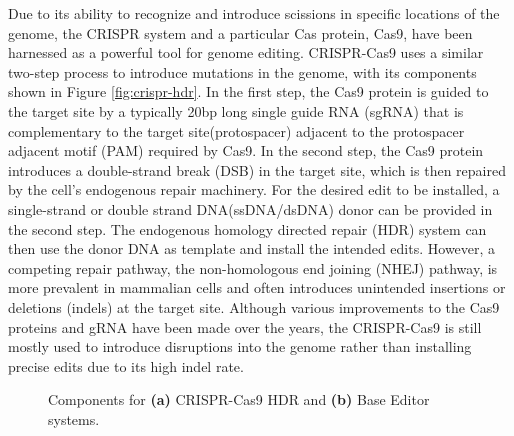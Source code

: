 Due to its ability to recognize and introduce scissions in specific locations of the genome, the CRISPR system and a particular Cas protein, Cas9, have been harnessed as a powerful tool for genome editing. CRISPR-Cas9 uses a similar two-step process to introduce mutations in the genome, with its components shown in Figure \ref{fig:crispr-hdr}. In the first step, the Cas9 protein is guided to the target site by a typically 20bp long single guide RNA (sgRNA) that is complementary to the target site(protospacer) adjacent to the protospacer adjacent motif (PAM) required by Cas9. In the second step, the Cas9 protein introduces a double-strand break (DSB) in the target site, which is then repaired by the cell's endogenous repair machinery. For the desired edit to be installed, a single-strand or double strand DNA(ssDNA/dsDNA) donor can be provided in the second step\cite{richardsonEnhancingHomologydirectedGenome2016,jasinRepairStrandBreaks2013}. The endogenous homology directed repair (HDR) system can then use the donor DNA as template and install the intended edits\cite{hsuDevelopmentApplicationsCRISPRCas92014}. However, a competing repair pathway, the non-homologous end joining (NHEJ) pathway, is more prevalent in mammalian cells and often introduces unintended insertions or deletions (indels) at the target site\cite{changNonhomologousDNAEnd2017}. Although various improvements to the Cas9 proteins and gRNA have been made over the years, the CRISPR-Cas9 is still mostly used to introduce disruptions into the genome rather than installing precise edits due to its high indel rate\cite{kantorCRISPRCas9DNABaseEditing2020,koeppelPredictionPrimeEditing2023}.

\begin{figure}[ht]
    \centering
    \caption{Components for \textbf{(a)} CRISPR-Cas9 HDR  and \textbf{(b)} Base Editor  systems.}
    \label{fig:crispr-base-editor}
\end{figure}

